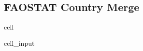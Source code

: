 \documentclass[letterpaper,10pt,english]{jupyterBook}
\begin{document}
\subsection{FAOSTAT Country Merge}
\label{\detokenize{notebooks/geo_coding:faostat-country-merge}}
\begin{sphinxuseclass}{cell}\begin{sphinxVerbatimInput}

\begin{sphinxuseclass}{cell_input}
\begin{sphinxVerbatim}[commandchars=\\\{\}]
     
\end{sphinxVerbatim}

\end{sphinxuseclass}\end{sphinxVerbatimInput}

\end{sphinxuseclass}
\end{document}

